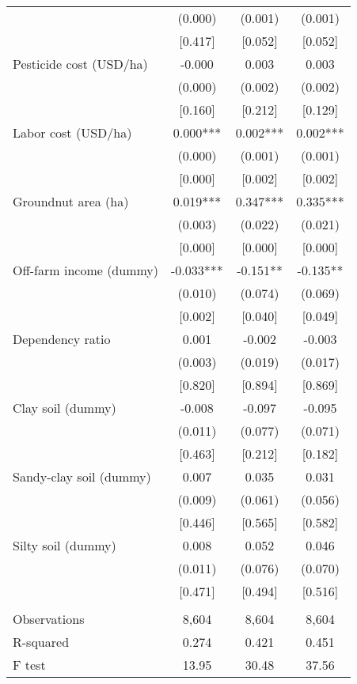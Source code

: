 \documentclass[]{article}
\begin{document}
\begin{tabular}{lccc}
 & (0.000) & (0.001) & (0.001) \\
 & [0.417] & [0.052] & [0.052] \\
Pesticide cost (USD/ha) & -0.000 & 0.003 & 0.003 \\
 & (0.000) & (0.002) & (0.002) \\
 & [0.160] & [0.212] & [0.129] \\
Labor cost (USD/ha) & 0.000*** & 0.002*** & 0.002*** \\
 & (0.000) & (0.001) & (0.001) \\
 & [0.000] & [0.002] & [0.002] \\
Groundnut area (ha) & 0.019*** & 0.347*** & 0.335*** \\
 & (0.003) & (0.022) & (0.021) \\
 & [0.000] & [0.000] & [0.000] \\
Off-farm income (dummy) & -0.033*** & -0.151** & -0.135** \\
 & (0.010) & (0.074) & (0.069) \\
 & [0.002] & [0.040] & [0.049] \\
Dependency ratio & 0.001 & -0.002 & -0.003 \\
 & (0.003) & (0.019) & (0.017) \\
 & [0.820] & [0.894] & [0.869] \\
Clay soil (dummy) & -0.008 & -0.097 & -0.095 \\
 & (0.011) & (0.077) & (0.071) \\
 & [0.463] & [0.212] & [0.182] \\
Sandy-clay soil (dummy) & 0.007 & 0.035 & 0.031 \\
 & (0.009) & (0.061) & (0.056) \\
 & [0.446] & [0.565] & [0.582] \\
Silty soil (dummy) & 0.008 & 0.052 & 0.046 \\
 & (0.011) & (0.076) & (0.070) \\
 & [0.471] & [0.494] & [0.516] \\
 &  &  &  \\
Observations & 8,604 & 8,604 & 8,604 \\
R-squared & 0.274 & 0.421 & 0.451 \\
 F test & 13.95 & 30.48 & 37.56 \\ \hline
\end{tabular}
\end{document}
